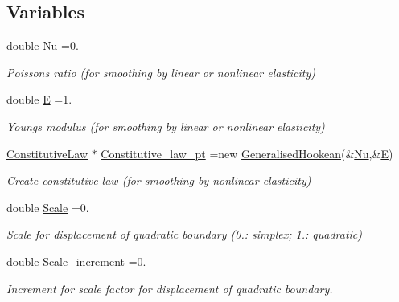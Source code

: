 \subsection*{Variables}
\begin{DoxyCompactItemize}
\item 
double \hyperlink{namespaceoomph_1_1Helper__namespace__for__mesh__smoothing_a27eabf4a5c7ca88b62dcb3e87462587e}{Nu} =0.
\begin{DoxyCompactList}\small\item\em Poisson\textquotesingle{}s ratio (for smoothing by linear or nonlinear elasticity) \end{DoxyCompactList}\item 
double \hyperlink{namespaceoomph_1_1Helper__namespace__for__mesh__smoothing_a898d8e0f8dc2e672397917061d06fe03}{E} =1.
\begin{DoxyCompactList}\small\item\em Young\textquotesingle{}s modulus (for smoothing by linear or nonlinear elasticity) \end{DoxyCompactList}\item 
\hyperlink{classoomph_1_1ConstitutiveLaw}{Constitutive\+Law} $\ast$ \hyperlink{namespaceoomph_1_1Helper__namespace__for__mesh__smoothing_a16460050187c2bd5edb4e5ae24578f0f}{Constitutive\+\_\+law\+\_\+pt} =new \hyperlink{classoomph_1_1GeneralisedHookean}{Generalised\+Hookean}(\&\hyperlink{namespaceoomph_1_1Helper__namespace__for__mesh__smoothing_a27eabf4a5c7ca88b62dcb3e87462587e}{Nu},\&\hyperlink{namespaceoomph_1_1Helper__namespace__for__mesh__smoothing_a898d8e0f8dc2e672397917061d06fe03}{E})
\begin{DoxyCompactList}\small\item\em Create constitutive law (for smoothing by nonlinear elasticity) \end{DoxyCompactList}\item 
double \hyperlink{namespaceoomph_1_1Helper__namespace__for__mesh__smoothing_a1becf6969521c3750d1267dd619a2d41}{Scale} =0.
\begin{DoxyCompactList}\small\item\em Scale for displacement of quadratic boundary (0.\+: simplex; 1.\+: quadratic) \end{DoxyCompactList}\item 
double \hyperlink{namespaceoomph_1_1Helper__namespace__for__mesh__smoothing_aba8998d13da8e9dc69ad0a2e2d59f215}{Scale\+\_\+increment} =0.
\begin{DoxyCompactList}\small\item\em Increment for scale factor for displacement of quadratic boundary. \end{DoxyCompactList}\end{DoxyCompactItemize}


